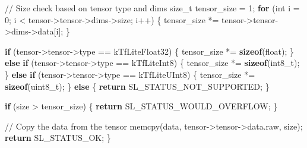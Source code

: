 \documentclass[
  9pt,
  letterpaper,
  abstract,
  titlepage]{scrbook}
\newenvironment{Shaded}{\begin{snugshade}}{\end{snugshade}}
\newcommand{\CommentTok}[1]{\textcolor[rgb]{0.37,0.37,0.37}{#1}}
\newcommand{\ControlFlowTok}[1]{\textcolor[rgb]{0.00,0.23,0.31}{\textbf{#1}}}
\newcommand{\DataTypeTok}[1]{\textcolor[rgb]{0.68,0.00,0.00}{#1}}
\newcommand{\DecValTok}[1]{\textcolor[rgb]{0.68,0.00,0.00}{#1}}
\newcommand{\KeywordTok}[1]{\textcolor[rgb]{0.00,0.23,0.31}{\textbf{#1}}}
\newcommand{\NormalTok}[1]{\textcolor[rgb]{0.00,0.23,0.31}{#1}}
\newcommand{\OperatorTok}[1]{\textcolor[rgb]{0.37,0.37,0.37}{#1}}
\begin{document}
\begin{Shaded}
\begin{Highlighting}[]
  \CommentTok{// Size check based on tensor type and dims}
  \DataTypeTok{size\_t}\NormalTok{ tensor\_size }\OperatorTok{=} \DecValTok{1}\OperatorTok{;}
  \ControlFlowTok{for} \OperatorTok{(}\DataTypeTok{int}\NormalTok{ i }\OperatorTok{=} \DecValTok{0}\OperatorTok{;}\NormalTok{ i }\OperatorTok{\textless{}}\NormalTok{ tensor}\OperatorTok{{-}\textgreater{}}\NormalTok{tensor}\OperatorTok{{-}\textgreater{}}\NormalTok{dims}\OperatorTok{{-}\textgreater{}}\NormalTok{size}\OperatorTok{;}\NormalTok{ i}\OperatorTok{++)} \OperatorTok{\{}
\NormalTok{    tensor\_size }\OperatorTok{*=}\NormalTok{ tensor}\OperatorTok{{-}\textgreater{}}\NormalTok{tensor}\OperatorTok{{-}\textgreater{}}\NormalTok{dims}\OperatorTok{{-}\textgreater{}}\NormalTok{data}\OperatorTok{[}\NormalTok{i}\OperatorTok{];}
  \OperatorTok{\}}
  
  \ControlFlowTok{if} \OperatorTok{(}\NormalTok{tensor}\OperatorTok{{-}\textgreater{}}\NormalTok{tensor}\OperatorTok{{-}\textgreater{}}\NormalTok{type }\OperatorTok{==}\NormalTok{ kTfLiteFloat32}\OperatorTok{)} \OperatorTok{\{}
\NormalTok{    tensor\_size }\OperatorTok{*=} \KeywordTok{sizeof}\OperatorTok{(}\DataTypeTok{float}\OperatorTok{);}
  \OperatorTok{\}} \ControlFlowTok{else} \ControlFlowTok{if} \OperatorTok{(}\NormalTok{tensor}\OperatorTok{{-}\textgreater{}}\NormalTok{tensor}\OperatorTok{{-}\textgreater{}}\NormalTok{type }\OperatorTok{==}\NormalTok{ kTfLiteInt8}\OperatorTok{)} \OperatorTok{\{}
\NormalTok{    tensor\_size }\OperatorTok{*=} \KeywordTok{sizeof}\OperatorTok{(}\DataTypeTok{int8\_t}\OperatorTok{);}
  \OperatorTok{\}} \ControlFlowTok{else} \ControlFlowTok{if} \OperatorTok{(}\NormalTok{tensor}\OperatorTok{{-}\textgreater{}}\NormalTok{tensor}\OperatorTok{{-}\textgreater{}}\NormalTok{type }\OperatorTok{==}\NormalTok{ kTfLiteUInt8}\OperatorTok{)} \OperatorTok{\{}
\NormalTok{    tensor\_size }\OperatorTok{*=} \KeywordTok{sizeof}\OperatorTok{(}\DataTypeTok{uint8\_t}\OperatorTok{);}
  \OperatorTok{\}} \ControlFlowTok{else} \OperatorTok{\{}
    \ControlFlowTok{return}\NormalTok{ SL\_STATUS\_NOT\_SUPPORTED}\OperatorTok{;}
  \OperatorTok{\}}
  
  \ControlFlowTok{if} \OperatorTok{(}\NormalTok{size }\OperatorTok{\textgreater{}}\NormalTok{ tensor\_size}\OperatorTok{)} \OperatorTok{\{}
    \ControlFlowTok{return}\NormalTok{ SL\_STATUS\_WOULD\_OVERFLOW}\OperatorTok{;}
  \OperatorTok{\}}
  
  \CommentTok{// Copy the data from the tensor}
\NormalTok{  memcpy}\OperatorTok{(}\NormalTok{data}\OperatorTok{,}\NormalTok{ tensor}\OperatorTok{{-}\textgreater{}}\NormalTok{tensor}\OperatorTok{{-}\textgreater{}}\NormalTok{data}\OperatorTok{.}\NormalTok{raw}\OperatorTok{,}\NormalTok{ size}\OperatorTok{);}
  \ControlFlowTok{return}\NormalTok{ SL\_STATUS\_OK}\OperatorTok{;}
\OperatorTok{\}}


\end{Highlighting}
\end{Shaded}
\end{document}
